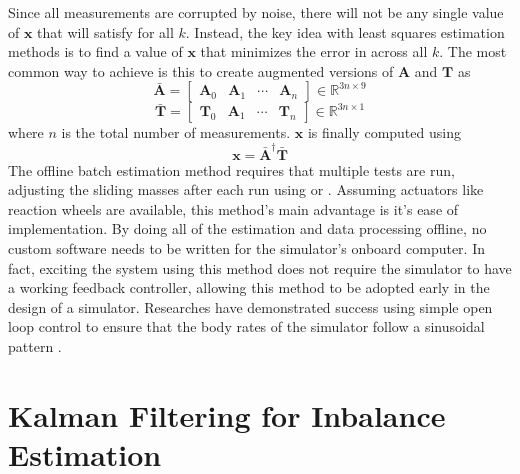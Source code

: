 Since all measurements are corrupted by noise, there will not be any single value of $\bm{x}$ that will satisfy  for all $k$. Instead, the key idea with least squares estimation methods is to find a value of $\bm{x}$ that minimizes the error in  across all $k$. The most common way to achieve is this to create augmented versions of $\bm{A}$ and $\bm{T}$ as
\begin{equation}
    \bar{\bm{A}}=\begin{bmatrix}
        \bm{A}_0 & \bm{A}_1 & \cdots & \bm{A}_n
    \end{bmatrix}\in \mathbb{R}^{3n \times 9}
\end{equation}
\begin{equation}
    \bar{\bm{T}}=\begin{bmatrix}
        \bm{T}_0 & \bm{A}_1 & \cdots & \bm{T}_n
    \end{bmatrix}\in \mathbb{R}^{3n \times 1}
\end{equation}
where $n$ is the total number of measurements. $\bm{x}$ is finally computed using 
\begin{equation}
    \bm{x}=\bar{\bm{A}}^{\dagger}\bar{\bm{T}}
\end{equation}
The offline batch estimation method requires that multiple tests are run, adjusting the sliding masses after each run using  or . Assuming actuators like reaction wheels are available, this method's main advantage is it's ease of implementation. By doing all of the estimation and data processing offline, no custom software needs to be written for the simulator's onboard computer. In fact, exciting the system using this method does not require the simulator to have a working feedback controller, allowing this method to be adopted early in the design of a simulator. Researches have demonstrated success using simple open loop control to ensure that the body rates of the simulator follow a sinusoidal pattern \cite{kim_automatic_2009} \cite{dam_applied_2014} \cite{noauthor_designing_2003}.



\section{Kalman Filtering for Inbalance Estimation}


